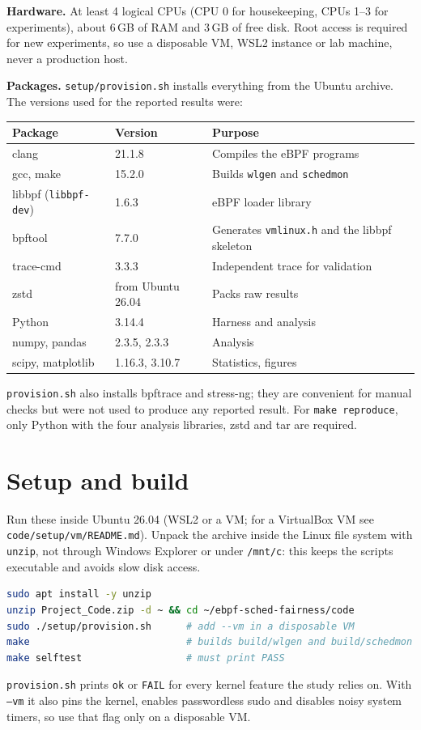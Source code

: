 \documentclass[10.5pt,a4paper]{article}
\newcommand{\f}[1]{\texttt{#1}}
\begin{document}
\textbf{Hardware.} At least 4 logical CPUs (CPU 0 for housekeeping, CPUs 1--3 for experiments), about 6\,GB of RAM and 3\,GB of free disk. Root access is required for new experiments, so use a disposable VM, WSL2 instance or lab machine, never a production host.

\textbf{Packages.} \f{setup/provision.sh} installs everything from the Ubuntu archive. The versions used for the reported results were:

\begin{center}
\begin{tabular}{@{}lll@{}}
\toprule
\textbf{Package} & \textbf{Version} & \textbf{Purpose} \\
\midrule
clang & 21.1.8 & Compiles the eBPF programs \\
gcc, make & 15.2.0 & Builds \f{wlgen} and \f{schedmon} \\
libbpf (\f{libbpf-dev}) & 1.6.3 & eBPF loader library \\
bpftool & 7.7.0 & Generates \f{vmlinux.h} and the libbpf skeleton \\
trace-cmd & 3.3.3 & Independent trace for validation \\
zstd & from Ubuntu 26.04 & Packs raw results \\
Python & 3.14.4 & Harness and analysis \\
numpy, pandas & 2.3.5, 2.3.3 & Analysis \\
scipy, matplotlib & 1.16.3, 3.10.7 & Statistics, figures \\
\bottomrule
\end{tabular}
\end{center}

\f{provision.sh} also installs bpftrace and stress-ng; they are convenient for manual checks but were not used to produce any reported result. For \f{make reproduce}, only Python with the four analysis libraries, zstd and tar are required.

\section{Setup and build}\label{sec:setup}
Run these inside Ubuntu 26.04 (WSL2 or a VM; for a VirtualBox VM see \f{code/setup/vm/README.md}). Unpack the archive inside the Linux file system with \f{unzip}, not through Windows Explorer or under \f{/mnt/c}: this keeps the scripts executable and avoids slow disk access.
\begin{lstlisting}[language=bash]
sudo apt install -y unzip
unzip Project_Code.zip -d ~ && cd ~/ebpf-sched-fairness/code
sudo ./setup/provision.sh      # add --vm in a disposable VM
make                           # builds build/wlgen and build/schedmon
make selftest                  # must print PASS
\end{lstlisting}
\f{provision.sh} prints \f{ok} or \f{FAIL} for every kernel feature the study relies on. With \f{--vm} it also pins the kernel, enables passwordless sudo and disables noisy system timers, so use that flag only on a disposable VM.
\end{document}
